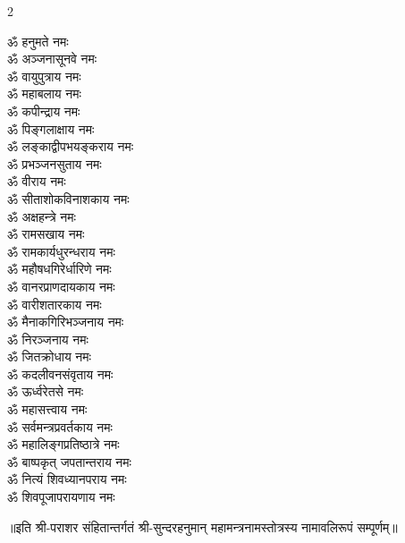 \begin{multicols}{2}
\begin{flushleft}
ॐ हनुमते नमः\\
ॐ अञ्जनासूनवे नमः\\
ॐ वायुपुत्राय नमः\\
ॐ महाबलाय नमः\\
ॐ कपीन्द्राय नमः\\
ॐ पिङ्गलाक्षाय नमः\\
ॐ लङ्काद्वीपभयङ्कराय नमः\\
ॐ प्रभञ्जनसुताय नमः\\
ॐ वीराय नमः\\
ॐ सीताशोकविनाशकाय नमः\hfill{}\\
ॐ अक्षहन्त्रे नमः\\
ॐ रामसखाय नमः\\
ॐ रामकार्यधुरन्धराय नमः\\
ॐ महौषधगिरेर्धारिणे नमः\\
ॐ वानरप्राणदायकाय नमः\\
ॐ वारीशतारकाय नमः\\
ॐ मैनाकगिरिभञ्जनाय नमः\\
ॐ निरञ्जनाय नमः\\
ॐ जितक्रोधाय नमः\\
ॐ कदलीवनसंवृताय नमः\hfill{}\\
ॐ ऊर्ध्वरेतसे नमः\\
ॐ महासत्त्वाय नमः\\
ॐ सर्वमन्त्रप्रवर्तकाय नमः\\
ॐ महालिङ्गप्रतिष्ठात्रे नमः\\
ॐ बाष्पकृत् जपतान्तराय नमः\\
ॐ नित्यं शिवध्यानपराय नमः\\
ॐ शिवपूजापरायणाय नमः\hfill{}\\
\end{flushleft}
\end{multicols}
\centerline{॥इति श्री-पराशर संहितान्तर्गतं श्री-सुन्दरहनुमान् महामन्त्रनामस्तोत्रस्य नामावलिरूपं सम्पूर्णम्॥}

